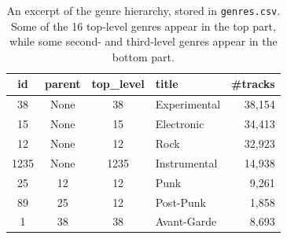 \documentclass{article}
\begin{document}


\begin{table}
	\small
	\centering
	\begin{tabular}{ccclr}
		\toprule
		id & parent & top\_level & title & \#tracks \\
		\midrule
		38 & None & 38 & Experimental & 38,154 \\
		15 & None & 15 & Electronic & 34,413 \\
		12 & None & 12 & Rock & 32,923 \\
		1235 & None & 1235 & Instrumental & 14,938 \\
		\midrule
		25 & 12 & 12 & Punk & 9,261 \\
		89 & 25 & 12 & Post-Punk & 1,858 \\
		1  & 38 & 38 & Avant-Garde & 8,693 \\
		\bottomrule
	\end{tabular}
	\caption{An excerpt of the genre hierarchy, stored in \texttt{genres.csv}. Some of the 16 top-level genres appear in the top part, while some second- and third-level genres appear in the bottom part.}
	\label{tab:genres}
\end{table}
\end{document}
